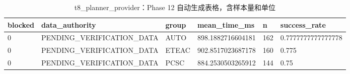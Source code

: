 \begin{table}[htbp]
\centering
\caption{t8_planner_provider：Phase 12 自动生成表格，含样本量和单位}
\begin{tabular}{llllll}
\hline
blocked & data_authority & group & mean_time_ms & n & success_rate \\
\hline
0 & PENDING\_VERIFICATION\_DATA & AUTO & 898.1882716604181 & 162 & 0.7777777777777778 \\
0 & PENDING\_VERIFICATION\_DATA & ETEAC & 902.8517023687178 & 160 & 0.775 \\
0 & PENDING\_VERIFICATION\_DATA & PCSC & 884.2530503265912 & 144 & 0.75 \\
\hline
\end{tabular}
\end{table}

